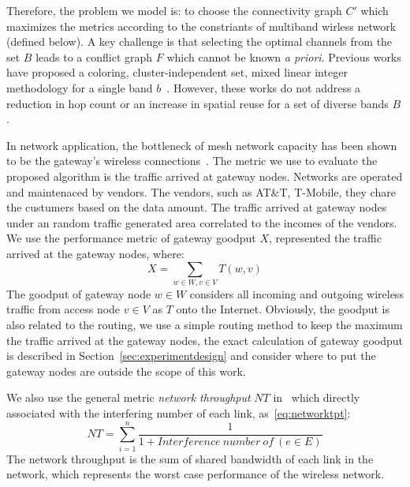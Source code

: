 Therefore, the problem we model is: to choose the connectivity graph $C'$ which maximizes
the metrics according to the constriants of multiband wirless network (defined below).
A key challenge is that selecting the optimal channels from
the set $B$ leads to a conflict graph $F$ which cannot be known {\it a priori}.
Previous works have proposed a coloring, cluster-independent set, mixed linear integer methodology
for a single band $b$~\cite{peng2012efficient,tang2005interference,doraghinejad2014channel}. 
However, these works do not address a reduction in hop count or an increase in spatial reuse for a set of 
diverse bands $B$. 

In network application, the bottleneck of mesh network capacity has been shown to be the gateway's wireless 
connections~\cite{robinson2008adding}.
The metric we use to evaluate the proposed algorithm is the traffic arrived at gateway nodes.
Networks are operated and maintenaced by vendors.
The vendors, such as AT\&T, T-Mobile, they chare the custumers based on the data amount. 
The traffic arrived at gateway nodes under an random traffic generated area 
correlated to the incomes of the vendors. We use the performance metric of 
gateway goodput $X$, represented the traffic arrived at the gateway nodes, where:
\begin{equation}
\label{eq:goodput}
X=\sum_{w \in W, v \in V}T(w,v)
\end{equation}
The goodput of gateway node $w\in W$ considers all incoming and outgoing wireless traffic 
from access node $v\in V$ as $T$ onto the Internet.
Obviously, the goodput is also related to the routing, we use a simple routing
method to keep the maximum the traffic arrived at the gateway nodes, the exact calculation 
of gateway goodput is described in Section~\ref{sec:experimentdesign} 
and consider where to put the gateway nodes are outside the scope of this work.

We also use the general metric \emph{network throughput} $NT$
in~\cite{tang2005interference,doraghinejad2014channel} 
which directly associated with the interfering number of each link, as~\ref{eq:networktpt}:
\begin{equation}
\label{eq:networktpt}
NT = \sum_{i=1}^{n}\frac{1}{1+Interference\ number\ of\ (e \in E)}
\end{equation}
The network throughput is the sum of shared bandwidth of each link in the network, 
which represents the worst case performance of the wireless network.

